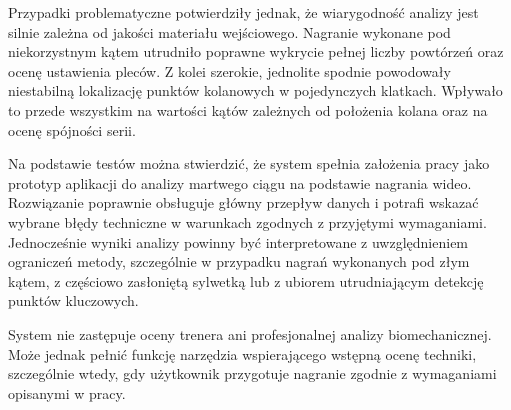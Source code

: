 Przypadki problematyczne potwierdziły jednak, że wiarygodność analizy jest silnie zależna od jakości materiału wejściowego. Nagranie wykonane pod niekorzystnym kątem utrudniło poprawne wykrycie pełnej liczby powtórzeń oraz ocenę ustawienia pleców. Z kolei szerokie, jednolite spodnie powodowały niestabilną lokalizację punktów kolanowych w pojedynczych klatkach. Wpływało to przede wszystkim na wartości kątów zależnych od położenia kolana oraz na ocenę spójności serii.

Na podstawie testów można stwierdzić, że system spełnia założenia pracy jako prototyp aplikacji do analizy martwego ciągu na podstawie nagrania wideo. Rozwiązanie poprawnie obsługuje główny przepływ danych i potrafi wskazać wybrane błędy techniczne w warunkach zgodnych z przyjętymi wymaganiami. Jednocześnie wyniki analizy powinny być interpretowane z uwzględnieniem ograniczeń metody, szczególnie w przypadku nagrań wykonanych pod złym kątem, z częściowo zasłoniętą sylwetką lub z ubiorem utrudniającym detekcję punktów kluczowych.

System nie zastępuje oceny trenera ani profesjonalnej analizy biomechanicznej. Może jednak pełnić funkcję narzędzia wspierającego wstępną ocenę techniki, szczególnie wtedy, gdy użytkownik przygotuje nagranie zgodnie z wymaganiami opisanymi w pracy.